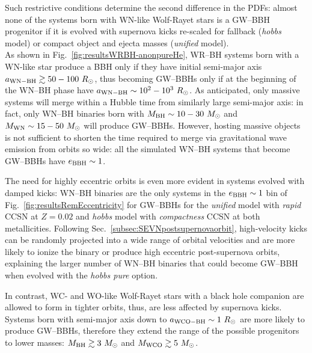 \documentclass[a4paper,titlepage]{book}     	%
\newcommand{\sun}{\ensuremath{_\odot}}
\newcommand{\msun}{\ensuremath{M\sun}}
\newcommand{\rsun}{R_{\odot}}
\begin{document}
Such restrictive conditions determine the second difference in the PDFs: almost none of the systems born with WN-like Wolf-Rayet stars is a GW--BBH progenitor if it is evolved with supernova kicks re-scaled for fallback (\emph{hobbs} model) or compact object and ejecta masses (\emph{unified} model).\\

As shown in Fig.\ \ref{fig:resultsWRBH-anonpureHe}, WR--BH systems born with a WN-like star produce a BBH only if they have initial semi-major axis $a_{\rm WN-BH} \gtrsim 50-100 ~ \rsun$, thus becoming GW--BBHs only if at the beginning of the WN--BH phase have $a_{\rm WN-BH} \sim 10^2 - 10^3 ~ \rsun$. As anticipated, only massive systems will merge within a Hubble time from similarly large semi-major axis: in fact, only WN--BH binaries born with $M_{\rm BH} \sim 10-30~\msun$ and $M_{\rm WN} \sim 15-50~\msun$ will produce GW--BBHs. However, hosting massive objects is not sufficient to shorten the time required to merge via gravitational wave emission from orbits so wide: all the simulated WN--BH systems that become GW--BBHs have $e_{\rm BBH} \sim 1$. 

The need for highly eccentric orbits is even more evident in systems evolved with damped kicks: WN--BH binaries are the only systems in the $e_{\rm BBH} \sim 1$ bin of Fig.\ \ref{fig:resultsRemEccentricity} for GW--BBHs for the \emph{unified} model with \emph{rapid} CCSN at $Z=0.02$ and \emph{hobbs} model with \emph{compactness} CCSN at both metallicities. Following Sec.\ \ref{subsec:SEVNpostsupernovaorbit}, high-velocity kicks can be randomly projected into a wide range of orbital velocities and are more likely to ionize the binary or produce high eccentric post-supernova orbits, explaining the larger number of WN--BH binaries that could become GW--BBH when evolved with the \emph{hobbs pure} option. 

In contrast, WC- and WO-like Wolf-Rayet stars with a black hole companion are allowed to form in tighter orbits, thus, are less affected by supernova kicks. Systems born with semi-major axis down to $a_{\rm WCO-BH} \sim 1~\rsun$ are more likely to produce GW--BBHs, therefore they extend the range of the possible progenitors to lower masses: $M_{\rm BH} \gtrsim 3~\msun$ and $M_{\rm WCO} \gtrsim 5~\msun$.
\end{document}
